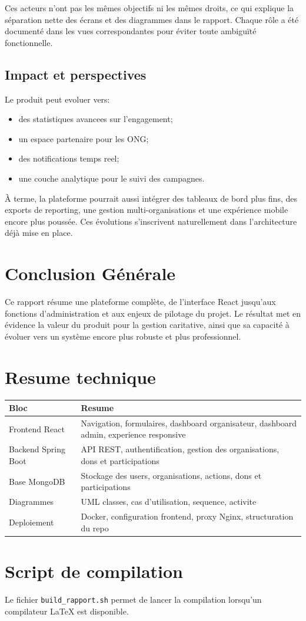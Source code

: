 \documentclass[12pt,a4paper]{report}
\begin{document}
Ces acteurs n'ont pas les mêmes objectifs ni les mêmes droits, ce qui explique la séparation nette des écrans et des diagrammes dans le rapport. Chaque rôle a été documenté dans les vues correspondantes pour éviter toute ambiguïté fonctionnelle.

\section{Impact et perspectives}
Le produit peut evoluer vers:
\begin{itemize}[leftmargin=1.2cm]
  \item des statistiques avancees sur l'engagement;
  \item un espace partenaire pour les ONG;
  \item des notifications temps reel;
  \item une couche analytique pour le suivi des campagnes.
\end{itemize}

À terme, la plateforme pourrait aussi intégrer des tableaux de bord plus fins, des exports de reporting, une gestion multi-organisations et une expérience mobile encore plus poussée. Ces évolutions s'inscrivent naturellement dans l'architecture déjà mise en place.

\chapter*{Conclusion Générale}
Ce rapport résume une plateforme complète, de l'interface React jusqu'aux fonctions d'administration et aux enjeux de pilotage du projet.
Le résultat met en évidence la valeur du produit pour la gestion caritative, ainsi que sa capacité à évoluer vers un système encore plus robuste et plus professionnel.

\appendix
\chapter{Resume technique}
\begin{longtable}{>{\raggedright\arraybackslash}p{4cm} p{10cm}}
\toprule
\textbf{Bloc} & \textbf{Resume} \\
\midrule
Frontend React & Navigation, formulaires, dashboard organisateur, dashboard admin, experience responsive \\
Backend Spring Boot & API REST, authentification, gestion des organisations, dons et participations \\
Base MongoDB & Stockage des users, organisations, actions, dons et participations \\
Diagrammes & UML classes, cas d'utilisation, sequence, activite \\
Deploiement & Docker, configuration frontend, proxy Nginx, structuration du repo \\
\bottomrule
\end{longtable}

\chapter{Script de compilation}
Le fichier \texttt{build\_rapport.sh} permet de lancer la compilation lorsqu'un compilateur LaTeX est disponible.
\end{document}
